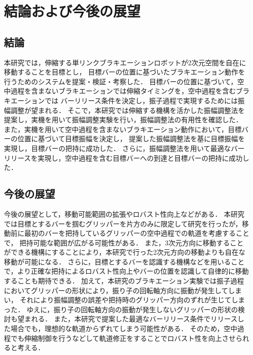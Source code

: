 \chapter[結論および今後の展望]%
{結論および今後の展望}
        \section{結論}

        本研究では，伸縮する単リンクブラキエーションロボットが2次元空間を自在に移動することを目標とし，
        目標バーの位置に基づいたブラキエーション動作を行うためのシステムを提案・検証・考察した．
        目標バーの位置に基づいて，空中過程を含まないブラキエーションでは伸縮タイミングを，空中過程を含むブラキエーションでは
        バーリリース条件を決定し，振子過程で実現するためには振幅調整が望まれる．
        そこで，本研究では伸縮する機構を活かした振幅調整法を提案し，実機を用いて振幅調整実験を行い，振幅調整法の有用性を確認した．
        また，実機を用いて空中過程を含まないブラキエーション動作において，目標バーの位置に基づいて目標振幅を決定し，
        提案した振幅調整法を基に目標振幅を実現し，目標バーの把持に成功した．
        さらに，振幅調整法を用いて最適なバーリリースを実現し，空中過程を含む目標バーへの到達と目標バーの把持に成功した．
       

          

        \section{今後の展望}
        
        今後の展望として，移動可能範囲の拡張やロバスト性向上などがある．
        本研究では目標とするバーを掴むグリッパーを片方のみに限定して研究を行ったが，移動前に最初のバーを把持しているグリッパーの空中過程での軌道を考慮することで，
        把持可能な範囲が広がる可能性がある．
        また，3次元方向に移動することができる機構にすることにより，本研究で行った2次元方向の移動よりも自在な移動が可能になる．
        さらに，目標とするバーを認識する機構などを用いることで，より正確な把持によるロバスト性向上やバーの位置を認識して自律的に移動することも期待できる．
        加えて，本研究のブラキエーション実験では振子過程においてグリッパーの形状により，振り子の回転軸方向に振動が発生してしまい，
        それにより振幅調整の誤差や把持時のグリッパー方向のずれが生じてしまった．
        ゆえに，振り子の回転軸方向の振動が発生しないグリッパーの形状の検討も望まれる．
        また，本研究で提案した最適なバーリリース条件でリリースした場合でも，理想的な軌道からずれてしまう可能性がある．
        そのため，空中過程でも伸縮制御を行うなどして軌道修正をすることでロバスト性を向上させられると考える．
